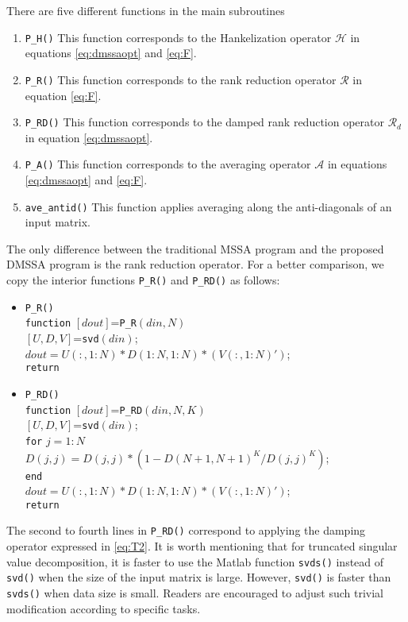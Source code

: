There are five different functions in the main subroutines
\begin{enumerate}
\item \texttt{P\_H()} This function corresponds to the Hankelization operator $\mathcal{H}$ in equations \ref{eq:dmssaopt} and \ref{eq:F}. 
\item \texttt{P\_R()} This function corresponds to the rank reduction operator $\mathcal{R}$ in equation \ref{eq:F}.
\item \texttt{P\_RD()} This function corresponds to the damped rank reduction operator $\mathcal{R}_d$ in equation \ref{eq:dmssaopt}.
\item \texttt{P\_A()} This function corresponds to the averaging operator $\mathcal{A}$ in equations \ref{eq:dmssaopt} and \ref{eq:F}.
\item \texttt{ave\_antid()} This function applies averaging along the anti-diagonals of an input matrix.
\end{enumerate}

The only difference between the traditional MSSA program and the proposed DMSSA program is the rank reduction operator. For a better comparison, we copy the interior functions \texttt{P\_R()} and \texttt{P\_RD()} as follows:
\begin{itemize}
\item \texttt{P\_R()} \\
\texttt{function} $[dout]$=\texttt{P\_R}$(din,N)$\\
$[U,D,V]$=\texttt{svd}$(din)$;\\
$dout=U(:,1:N)*D(1:N,1:N)*(V(:,1:N)')$;\\
\texttt{return}

\item \texttt{P\_RD()}\\
\texttt{function} $[dout]$=\texttt{P\_RD}$(din,N,K)$ \\
    $[U,D,V]$=\texttt{svd}$(din)$;\\
    \texttt{for} $j=1:N$\\
        $D(j,j)=D(j,j)*(1-D(N+1,N+1)^K/D(j,j)^K)$;\\
    \texttt{end}        \\
    $dout=U(:,1:N)*D(1:N,1:N)*(V(:,1:N)')$;\\
\texttt{return}
\end{itemize}
The second to fourth lines in \texttt{P\_RD()} correspond to applying the damping operator expressed in \ref{eq:T2}. It is worth mentioning that for truncated singular value decomposition, it is faster to use the Matlab function \texttt{svds()} instead 
of \texttt{svd()} when the size of the input matrix is large. However, \texttt{svd()} is faster than \texttt{svds()} when data size is small. Readers are encouraged to adjust such trivial modification according to specific tasks.

